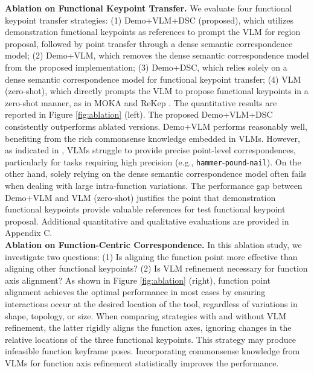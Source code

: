 \noindent \textbf{Ablation on Functional Keypoint Transfer.} We evaluate four functional keypoint transfer strategies: (1) Demo+VLM+DSC (proposed), which utilizes demonstration functional keypoints as references to prompt the VLM for region proposal, followed by point transfer through a dense semantic correspondence model; (2) Demo+VLM, which removes the dense semantic correspondence model from the proposed implementation; (3) Demo+DSC, which relies solely on a dense semantic correspondence model for functional keypoint transfer; (4) VLM (zero-shot), which directly prompts the VLM to propose functional keypoints in a zero-shot manner, as in MOKA \cite{liu2024moka} and ReKep \cite{huangrekep}. The quantitative results are reported in Figure \ref{fig:ablation} (left). The proposed Demo+VLM+DSC consistently outperforms ablated versions. Demo+VLM performs reasonably well, benefiting from the rich commonsense knowledge embedded in VLMs. However, as indicated in \cite{rahmanzadehgervi2024vision}, VLMs struggle to provide precise point-level correspondences, particularly for tasks requiring high precision (e.g., \texttt{hammer}-\texttt{pound}-\texttt{nail}). On the other hand, solely relying on the dense semantic correspondence model often fails when dealing with large intra-function variations. The performance gap between Demo+VLM and VLM (zero-shot) justifies the point that demonstration functional keypoints provide valuable references for test functional keypoint proposal. Additional quantitative and qualitative evaluations are provided in Appendix C.\\

\noindent \textbf{Ablation on Function-Centric Correspondence.} In this ablation study, we investigate two questions: (1) Is aligning the function point more effective than aligning other functional keypoints? (2) Is VLM refinement necessary for function axis alignment? As shown in Figure \ref{fig:ablation} (right), function point alignment achieves the optimal performance in most cases by ensuring interactions occur at the desired location of the tool, regardless of variations in shape, topology, or size. When comparing strategies with and without VLM refinement, the latter rigidly aligns the function axes, ignoring changes in the relative locations of the three functional keypoints. This strategy may produce infeasible function keyframe poses. Incorporating commonsense knowledge from VLMs for function axis refinement statistically improves the performance. 







